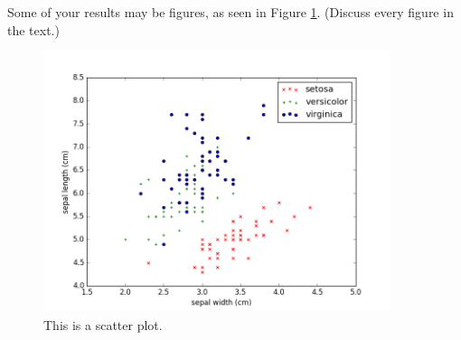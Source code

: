 % 
% 

Some of your results may be figures, as seen in Figure \ref{fig:scatter}. (Discuss every figure in the text.)

\begin{figure}
    \centering
    \includegraphics[width=4in]{images/scatter.png}
    \caption{This is a scatter plot.}
    \label{fig:scatter}
 \end{figure}
